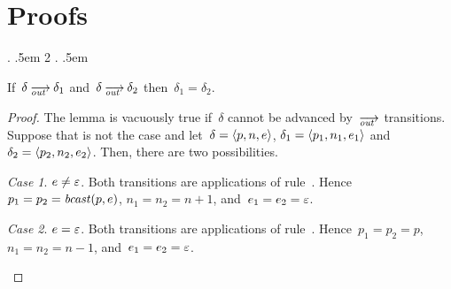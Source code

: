 \appendix
\section{Proofs}
\label{sec.proofs}

\makeatletter
{}%
  {\thm@preskip\topsep \divide\thm@preskip\tw@}%
  {\thm@postskip\thm@preskip}%
  {\addtolength{\@totalleftmargin}{\parindent}%
    \addtolength{\linewidth}{-\parindent}%
     \parindent \linewidth
    \normalfont}%
  {\z@}%
  {\itshape}%
  {.}%
  {.5em}%
  {}%
%
  {\thm@preskip\topsep \divide\thm@preskip\tw@}%
  {\thm@postskip\thm@preskip}%
  {\addtolength{\@totalleftmargin}{\parindent}%
    \addtolength{\linewidth}{-\parindent}%
     2\parindent \linewidth
    \normalfont}%
  {\z@}%
  {\itshape}%
  {.}%
  {.5em}%
  {}%
\makeatletter

\theoremstyle{remark}
\newtheorem{case}{Case}

\theoremstyle{subcase}
\newtheorem{subcase}{Case}

\theoremstyle{subsubcase}
\newtheorem{subsubcase}{Case}




\begin{lemma}\label{lem.det-out}
  If~$\delta\out\delta_1$ and~$\delta\out\delta_2$ then~$\delta_1=\delta_2$.
\end{lemma}
\begin{proof}
  The lemma is vacuously true if~$\delta$ cannot be advanced by~$\out$
  transitions.  Suppose that is not the case and let~$\delta=\<p,n,e>$,
  $\delta_1=\<p_1,n_1,e_1>$ and~$\delta_2=\<p_2,n_2,e_2>$.  Then, there are
  two possibilities.
  \begin{case}
    $e\ne\varepsilon$.  Both transitions are applications of rule~.
    Hence~$p_1=p_2=\operatorname{\mathit{bcast}}(p,e)$, $n_1=n_2=n+1$, and~$e_1=e_2=\varepsilon$.
  \end{case}
  \begin{case}
    $e=\varepsilon$.  Both transitions are applications of rule~.
    Hence~$p_1=p_2=p$, $n_1=n_2=n-1$, and~$e_1=e_2=\varepsilon$.\qedhere
  \end{case}
\end{proof}

